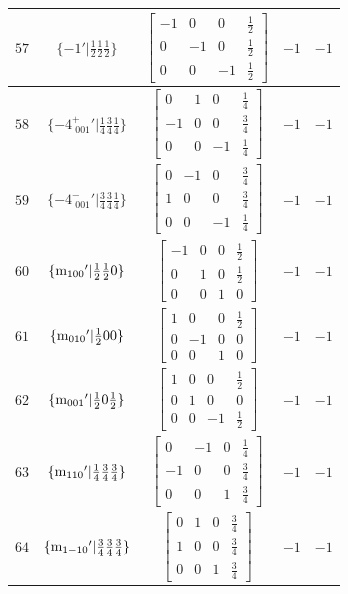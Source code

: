 \documentclass[fleqn,8pt]{jsarticle}
\begin{document}
\begin{longtable}{ccccc}
$ 57 $ & $ \{-1{}'|\frac{1}{2} \frac{1}{2} \frac{1}{2}\} $ & $ \begin{bmatrix} -1 & 0 & 0 & \frac{1}{2} \\ 0 & -1 & 0 & \frac{1}{2} \\ 0 & 0 & -1 & \frac{1}{2} \end{bmatrix} $ & $ -1 $ & $ -1 $ \\ \hline
$ 58 $ & $ \{-4^{+}_{\,\,001}{}'|\frac{1}{4} \frac{3}{4} \frac{1}{4}\} $ & $ \begin{bmatrix} 0 & 1 & 0 & \frac{1}{4} \\ -1 & 0 & 0 & \frac{3}{4} \\ 0 & 0 & -1 & \frac{1}{4} \end{bmatrix} $ & $ -1 $ & $ -1 $ \\ \hline
$ 59 $ & $ \{-4^{-}_{\,\,001}{}'|\frac{3}{4} \frac{3}{4} \frac{1}{4}\} $ & $ \begin{bmatrix} 0 & -1 & 0 & \frac{3}{4} \\ 1 & 0 & 0 & \frac{3}{4} \\ 0 & 0 & -1 & \frac{1}{4} \end{bmatrix} $ & $ -1 $ & $ -1 $ \\ \hline
$ 60 $ & $ \{{\rm m}_{100}{}'|\frac{1}{2} \frac{1}{2} 0\} $ & $ \begin{bmatrix} -1 & 0 & 0 & \frac{1}{2} \\ 0 & 1 & 0 & \frac{1}{2} \\ 0 & 0 & 1 & 0 \end{bmatrix} $ & $ -1 $ & $ -1 $ \\ \hline
$ 61 $ & $ \{{\rm m}_{010}{}'|\frac{1}{2} 0 0\} $ & $ \begin{bmatrix} 1 & 0 & 0 & \frac{1}{2} \\ 0 & -1 & 0 & 0 \\ 0 & 0 & 1 & 0 \end{bmatrix} $ & $ -1 $ & $ -1 $ \\ \hline
$ 62 $ & $ \{{\rm m}_{001}{}'|\frac{1}{2} 0 \frac{1}{2}\} $ & $ \begin{bmatrix} 1 & 0 & 0 & \frac{1}{2} \\ 0 & 1 & 0 & 0 \\ 0 & 0 & -1 & \frac{1}{2} \end{bmatrix} $ & $ -1 $ & $ -1 $ \\ \hline
$ 63 $ & $ \{{\rm m}_{110}{}'|\frac{1}{4} \frac{3}{4} \frac{3}{4}\} $ & $ \begin{bmatrix} 0 & -1 & 0 & \frac{1}{4} \\ -1 & 0 & 0 & \frac{3}{4} \\ 0 & 0 & 1 & \frac{3}{4} \end{bmatrix} $ & $ -1 $ & $ -1 $ \\ \hline
$ 64 $ & $ \{{\rm m}_{1-10}{}'|\frac{3}{4} \frac{3}{4} \frac{3}{4}\} $ & $ \begin{bmatrix} 0 & 1 & 0 & \frac{3}{4} \\ 1 & 0 & 0 & \frac{3}{4} \\ 0 & 0 & 1 & \frac{3}{4} \end{bmatrix} $ & $ -1 $ & $ -1 $ \\
\end{longtable}
\end{document}
